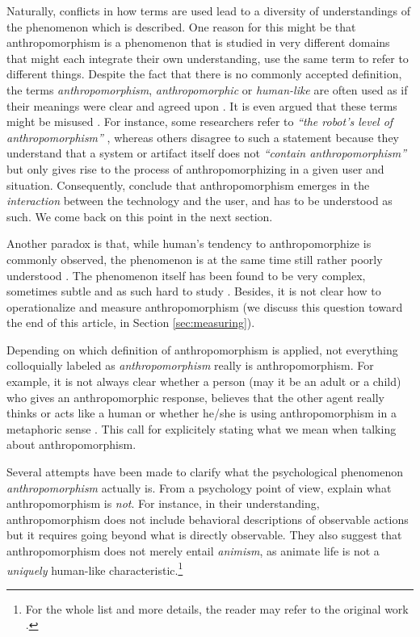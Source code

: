 \documentclass{frontiersSCNS} %
\begin{document}
Naturally, conflicts in how terms are used lead to a diversity of understandings
of the phenomenon which is described.  One reason for this might be that
anthropomorphism is a phenomenon that is studied in very different domains that
might each integrate their own understanding, use the same term to refer to
different things.  Despite the fact that there is no commonly accepted
definition, the terms \textit{anthropomorphism}, \textit{anthropomorphic} or
\textit{human-like} are often used as if their meanings were clear and agreed
upon \citep{persson_anthropomorphism_2000}. It is even argued that these terms
might be misused \citep{duffy_anthropomorphism_2002,epley_when_2008}.  For
instance, some researchers refer to \textit{``the robot's level of
anthropomorphism''} \citep{bartneck_is_2007,feil-seifer_human-robot_2008},
whereas others disagree to such a statement because they understand that a
system or artifact itself does not \textit{``contain anthropomorphism''} but
only gives rise to the process of anthropomorphizing in a given user and
situation. Consequently, \cite{persson_anthropomorphism_2000} conclude that
anthropomorphism emerges in the \textit{interaction} between the technology and
the user, and has to be understood as such. We come back on this point in the
next section.


Another paradox is that, while human's tendency to anthropomorphize is commonly
observed, the phenomenon is at the same time still rather poorly understood
\citep{epley_seeing_2007}. The phenomenon itself has been found to be very
complex, sometimes subtle and as such hard to study
\citep{duffy_anthropomorphism_2002,epley_when_2008}. Besides, it is not clear
how to operationalize and measure anthropomorphism (we discuss this question
toward the end of this article, in Section \ref{sec:measuring}).

Depending on which definition of anthropomorphism is applied, not everything 
colloquially labeled as \emph{anthropomorphism} really is anthropomorphism.
For example, it is not always clear whether a person (may it be an adult or 
a child) who gives an anthropomorphic response, believes that the other agent really 
thinks or acts like a human or whether he/she is using anthropomorphism in a metaphoric 
sense \citep{leeds_childrens_1992}.
This call for explicitely stating what we mean when talking about anthropomorphism. 

Several attempts have been made to clarify what the psychological phenomenon
\emph{anthropomorphism} actually is.  From a psychology point of view,
\citet{epley_when_2008} explain what anthropomorphism is \textit{not}. For
instance, in their understanding, anthropomorphism does not include behavioral
descriptions of observable actions but it requires going beyond what is directly
observable. They also suggest that anthropomorphism does not merely entail
\textit{animism}, as animate life is not a \textit{uniquely} human-like
characteristic.\footnote{For the whole list and more details, the reader may
refer to the original work \citep{epley_when_2008}.}
\end{document}
